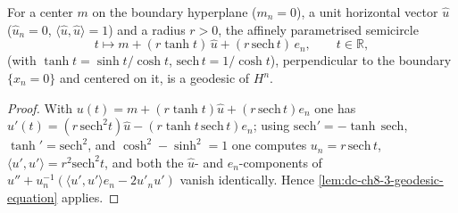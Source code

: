 \begin{lemma}
  \label{lem:dc-ch8-3-semicircle-geodesic}
  \leanok
  For a center $m$ on the boundary hyperplane ($m_n=0$), a unit horizontal vector
  $\hat u$ ($\hat u_n=0$, $\langle\hat u,\hat u\rangle=1$) and a radius $r>0$, the
  affinely parametrised semicircle
  $$
  t\longmapsto m+(r\tanh t)\,\hat u+(r\,\mathrm{sech}\,t)\,e_n,\qquad t\in\mathbb R,
  $$
  (with $\tanh t=\sinh t/\cosh t$, $\mathrm{sech}\,t=1/\cosh t$), perpendicular to
  the boundary $\{x_n=0\}$ and centered on it, is a geodesic of $H^n$.
\end{lemma}
\begin{proof}
  \leanok
  With $u(t)=m+(r\tanh t)\hat u+(r\,\mathrm{sech}\,t)e_n$ one has
  $u'(t)=(r\,\mathrm{sech}^2 t)\hat u-(r\tanh t\,\mathrm{sech}\,t)e_n$; using
  $\mathrm{sech}'=-\tanh\,\mathrm{sech}$, $\tanh'=\mathrm{sech}^2$, and
  $\cosh^2-\sinh^2=1$ one computes $u_n=r\,\mathrm{sech}\,t$,
  $\langle u',u'\rangle=r^2\mathrm{sech}^2 t$, and both the $\hat u$- and
  $e_n$-components of $u''+u_n^{-1}(\langle u',u'\rangle e_n-2u'_n u')$ vanish
  identically. Hence \cref{lem:dc-ch8-3-geodesic-equation} applies.
\end{proof}

